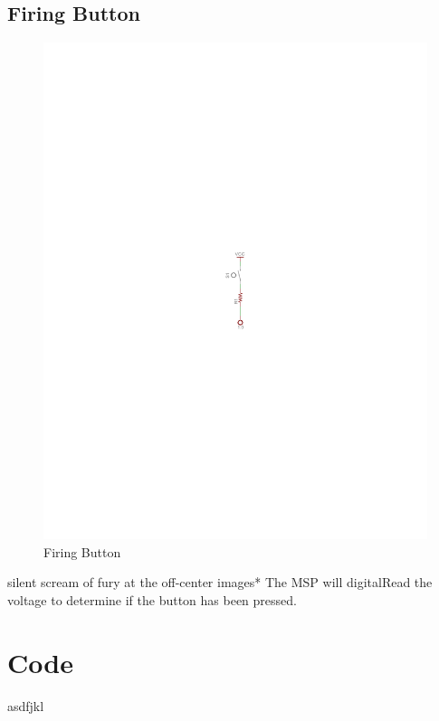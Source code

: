 \documentclass[a4paper, 11pt]{article}
\begin{document}
	\subsection{Firing Button}
	\begin{figure}[!ht]
		\centering
		\vspace{-11cm}
		\includegraphics{report-images/firing-button}
		\vspace{-12cm}
		\caption{Firing Button}
	\end{figure}
	\noindent *silent scream of fury at the off-center images*  The MSP will digitalRead the voltage to determine if the button has been pressed.
\newpage
\section{Code}
asdfjkl
\end{document}
